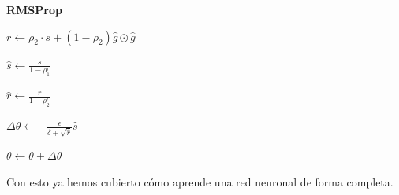 \begin{itemize}
\begin{algorithm}[H]{\Large{\textbf{RMSProp}}}
{			$r\leftarrow \rho_2 \cdot s + (1-\rho_2)\hat{g}\odot \hat{g}$
			
			$\hat{s}\leftarrow \frac{s}{1-\rho_1^r}$
			
			$\hat{r}\leftarrow \frac{r}{1-\rho_2^r}$
			
			$\Delta \theta \leftarrow - \frac{\epsilon}{\delta + \sqrt{\hat{r}}}\hat{s}$
			
			$\theta \leftarrow \theta + \Delta \theta$
			
		}
		
		\vspace{10px}
		
		
		\vspace{5px}
	\end{algorithm}
\end{itemize}

Con esto ya hemos cubierto cómo aprende una red neuronal de forma completa.